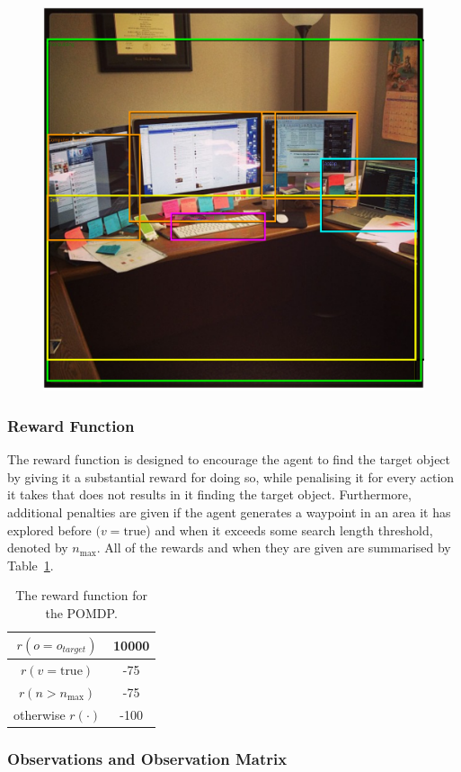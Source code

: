 \documentclass[runningheads]{llncs}
\begin{document}
\begin{figure}
  \centering
  \includegraphics[width=0.5\columnwidth]{figures/desk_example.png}
  \caption{}\label{fig:openimage}
\end{figure}

\subsubsection{Reward Function}

The reward function is designed to encourage the agent to find the target object by giving it a substantial reward for doing so, while penalising it for every action it takes that does not results in it finding the target object.
Furthermore, additional penalties are given if the agent generates a waypoint in an area it has explored before $(v = \textrm{true}$) and when it exceeds some search length threshold, denoted by $n_{\max}$.
All of the rewards and when they are given are summarised by Table~\ref{tab:rewards}.

\begin{table}
  \centering
  \caption{The reward function for the POMDP. }\label{tab:rewards}
  \begin{tabular}{cc}
    \toprule
    $r(o = o_{target})$ & 10000 \\ \midrule
    $r(v = \textrm{true})$  & -75 \\ \midrule
    $r(n > n_{\max})$ & -75 \\ \midrule
    otherwise $r(\cdot)$ & -100  \\ \midrule
    \bottomrule
  \end{tabular}
\end{table}

\subsubsection{Observations and Observation Matrix}
\end{document}

